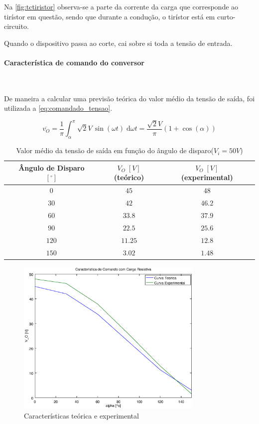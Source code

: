 \documentclass[a4paper,11pt]{article}
\numberwithin{equation}{section}
\begin{document}
Na \autoref{fig:tctiristor} observa-se a parte da corrente da carga que corresponde ao tirístor em questão, sendo que durante a condução, o tirístor está em curto-circuito.

Quando o dispositivo passa ao corte, cai sobre si toda a tensão de entrada.

\paragraph{Característica de comando do conversor} \mbox{}\

De maneira a calcular uma previsão teórica do valor médio da tensão de saída, foi utilizada a \autoref{eq:comandado_tensao}.

\begin{equation}
\label{eq:comandado_tensao}
\overline{v_O}=\frac{1}{\pi} \int_\alpha^\pi \sqrt{2} V \,\sin{(\omega t)}\;\mathrm{d}\omega t = \frac{\sqrt{2}V}{\pi}(1 + \cos{(\alpha)})
\end{equation}

\begin{table}[H]
\centering
\begin{tabular}{c c c c c c c}
\hfil & Ângulo de Disparo $[^\circ]$ & \hfil & $V_O\;[V]$ (teórico) & \hfil & $V_O\;[V]$ (experimental) & \hfil \\
\hline
			&$0$&	&$45$&		&$48$&\\
\rowcolor{SkyBlue}	&$30$&	&$42$&		&$46.2$&\\
			&$60$&	&$33.8$&	&$37.9$&\\
\rowcolor{SkyBlue}	&$90$&	&$22.5$&	&$25.6$&\\
			&$120$&	&$11.25$&	&$12.8$&\\
\rowcolor{SkyBlue}	&$150$&	&$3.02$&	&$1.48$&\\
\hline
\end{tabular}
\caption{Valor médio da tensão de saída em função do ângulo de disparo($V_i = 50 V$)}
\label{tab:akpk}
\end{table}

\begin{figure}[H]
	\centering
	\includegraphics[keepaspectratio=true, width=0.8\textwidth]{img/comando1}
	\caption{Características teórica e experimental}
	\label{fig:comando1}
	\vspace{-0.8em}
\end{figure}
\end{document}
